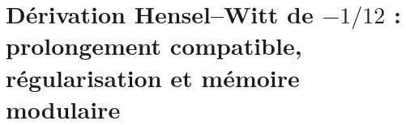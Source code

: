 \chapter{Dérivation Hensel--Witt de \(-1/12\) : prolongement compatible, régularisation et mémoire modulaire}
\label{chap:p3-final:33:menos_un_doceavo}

